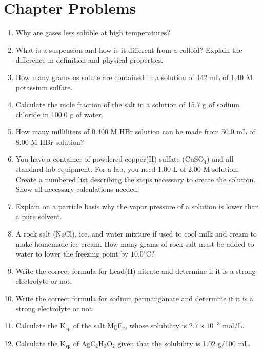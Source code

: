 \documentclass[../hchem.tex]{subfiles}
\begin{document}
\section*{Chapter Problems}
\begin{enumerate}
    \item Why are gases less soluble at high temperatures?
    \item What is a suspension and how is it different from a colloid? Explain the difference in definition and physical properties.
    \item How many grams os solute are contained in a solution of 142 mL of 1.40 M potassium sulfate.
    \item Calculate the mole fraction of the salt in a solution of 15.7 g of sodium chloride in 100.0 g of water.
    \item How many milliliters of 0.400 M HBr solution can be made from 50.0 mL of 8.00 M HBr solution?
    \item You have a container of powdered copper(II) sulfate (CuSO$_4$) and all standard lab equipment. For a lab, you need 1.00 L of 2.00 M solution. Create a numbered list describing the steps necessary to create the solution. Show all necessary calculations needed.
    \item Explain on a particle basis why the vapor pressure of a solution is lower than a pure solvent.
    \item A rock salt (NaCl), ice, and water mixture if used to cool milk and cream to make homemade ice cream. How many grams of rock salt must be added to water to lower the freezing point by $10.0^{\circ}$C?
    \item Write the correct formula for Lead(II) nitrate and determine if it is a strong electrolyte or not.
    \item Write the correct formula for sodium permanganate and determine if it is a strong electrolyte or not.
    \item Calculate the K$_{\text{sp}}$ of the salt MgF$_2$, whose solubility is $2.7\times 10^{-3}$ mol/L.
    \item Calculate the K$_{\text{sp}}$ of AgC$_2$H$_3$O$_2$ given that the solubility is 1.02 g/100 mL.
\end{enumerate}
\end{document}
